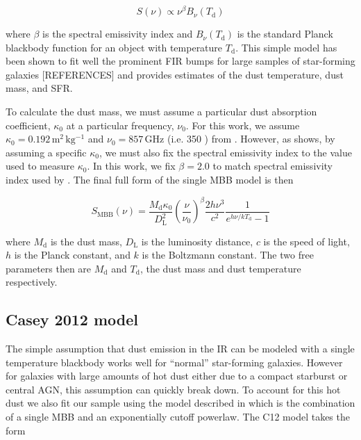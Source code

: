 \documentclass[fleqn, usenatbib]{mnras}
\begin{document}
\begin{equation}
S(\nu) \propto \nu^{\beta}B_{\nu}(T_{\mathrm{d}})
\end{equation}

\noindent where $\beta$ is the spectral emissivity index and $B_{\nu}(T_{\mathrm{d}})$ is the standard Planck blackbody function for an object with temperature $T_{\mathrm{d}}$. This simple model has been shown to fit well the prominent FIR bumps for large samples of star-forming galaxies [REFERENCES] and provides estimates of the dust temperature, dust mass, and SFR.

To calculate the dust mass, we must assume a particular dust absorption coefficient, $\kappa_{0}$ at a particular frequency, $\nu_{0}$. For this work, we assume $\kappa_{0}=0.192\,\mathrm{m^{2}\,kg^{-1}}$ and $\nu_{0}=857\,\mathrm{GHz}$ (i.e. 350 \micron) from \citet{Draine:2003gd}. However, as \citet{Bianchi:2013jk} shows, by assuming a specific $\kappa_{0}$, we must also fix the spectral emissivity index to the value used to measure $\kappa_{0}$. In this work, we fix $\beta=2.0$ to match spectral emissivity index used by \citet{Draine:2003gd}. The final full form of the single MBB model is then

\begin{equation}\label{eq:greybody}
S_{\mathrm{MBB}}(\nu) = \frac{M_{\mathrm{d}}\kappa_{0}}{D_{\mathrm{L}}^2}\left(\frac{\nu}{\nu_{0}}\right)^{\beta}\frac{2h\nu^{3}}{c^{2}}\frac{1}{e^{{h\nu/kT_{\mathrm{d}}}}-1}
\end{equation}

\noindent where $M_{\mathrm{d}}$ is the dust mass, $D_{\mathrm{L}}$ is the luminosity distance, $c$ is the speed of light, $h$ is the Planck constant, and $k$ is the Boltzmann constant. The two free parameters then are $M_{\mathrm{d}}$ and $T_{\mathrm{d}}$, the dust mass and dust temperature respectively.

\subsection{Casey 2012 model}
The simple assumption that dust emission in the IR can be modeled with a single temperature blackbody works well for ``normal'' star-forming galaxies. However for galaxies with large amounts of hot dust either due to a compact starburst or central AGN, this assumption can quickly break down. To account for this hot dust we also fit our sample using the model described in \citet[][hereafter C12]{Casey:2012jl} which is the combination of a single MBB and an exponentially cutoff powerlaw. The C12 model takes the form
\end{document}
